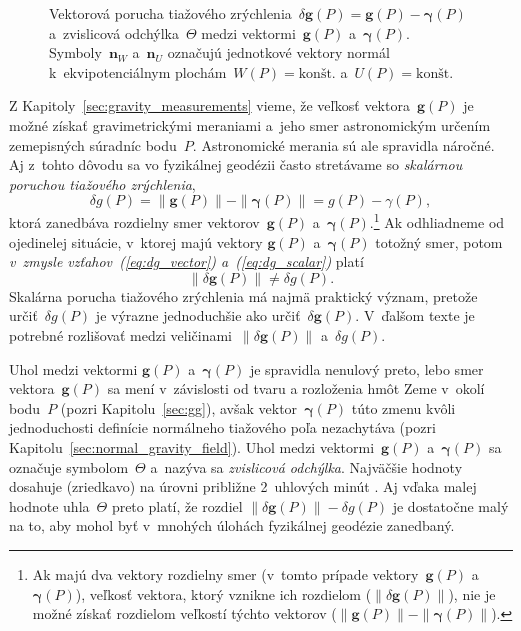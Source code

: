 \documentclass[a4paper, 12pt]{book}
\let\vec\mathbf
\begin{document}
\begin{figure}[bt]
\centering

\caption{Vektorová porucha tiažového zrýchlenia~$\delta \vec g(P) = \vec g(P) 
- \boldsymbol\gamma(P)$ a~zvislicová odchýlka~$\Theta$ medzi vektormi~$\vec 
g(P)$ a~$\boldsymbol\gamma(P)$.  Symboly~$\vec n_W$ a~$\vec n_U$ označujú 
jednotkové vektory normál k~ekvipotenciálnym plochám~$W(P) 
= \textrm{kon\v{s}t.}$ a~$U(P) = \textrm{kon\v{s}t.}$}
\label{fig:gravity_disturbance}
\end{figure}

Z Kapitoly~\ref{sec:gravity_measurements} vieme, že veľkosť vektora~$\vec g(P)$ 
je možné získať gravimetrickými meraniami a~jeho smer astronomickým určením 
zemepisných súradníc bodu~$P$.  Astronomické merania sú ale spravidla náročné.  
Aj z~tohto dôvodu sa vo fyzikálnej geodézii často stretávame so \emph{skalárnou 
poruchou tiažového zrýchlenia},
%
\begin{equation}
\label{eq:dg_scalar}
\delta g(P) = \| \vec g(P) \| - \| \boldsymbol \gamma(P) \| = g(P) 
- \gamma(P){,}
\end{equation}
%
ktorá zanedbáva rozdielny smer vektorov~$\vec g(P)$ a~$\boldsymbol 
\gamma(P)$.\footnote{Ak majú dva vektory rozdielny smer (v~tomto prípade 
vektory~$\vec g(P)$ a~$\boldsymbol \gamma(P)$), veľkosť vektora, ktorý vznikne 
ich rozdielom ($\| \delta \vec g(P) \|$), nie je možné získať rozdielom 
veľkostí týchto vektorov ($\| \vec g(P) \| - \| \boldsymbol \gamma(P) \|$).}  
Ak odhliadneme od ojedinelej situácie, v~ktorej majú vektory $\vec g(P)$ 
a~$\boldsymbol{\gamma}(P)$ totožný smer, potom \emph{v~zmysle 
vzťahov~(\ref{eq:dg_vector}) a~(\ref{eq:dg_scalar})} platí
%
\begin{equation}
\| \delta \vec g(P) \| \neq \delta g(P){.}
\end{equation}
%
Skalárna porucha tiažového zrýchlenia má najmä praktický význam, pretože 
určiť~$\delta g(P)$ je výrazne jednoduchšie ako určiť~$\delta \vec g(P)$.  
V~ďalšom texte je potrebné rozlišovať medzi veličinami~$\| \delta \vec g(P) \|$ 
a~$\delta g(P)$.

Uhol medzi vektormi $\vec g(P)$ a~$\boldsymbol{\gamma}(P)$ je spravidla 
nenulový preto, lebo smer vektora~$\vec g(P)$ sa mení v~závislosti od tvaru 
a rozloženia hmôt Zeme v~okolí bodu~$P$ (pozri Kapitolu~\ref{sec:gg}), avšak 
vektor~$\boldsymbol \gamma(P)$ túto zmenu kvôli jednoduchosti definície 
normálneho tiažového poľa nezachytáva (pozri 
Kapitolu~\ref{sec:normal_gravity_field}).  Uhol medzi vektormi~$\vec g(P)$ 
a~$\boldsymbol \gamma(P)$ sa označuje symbolom~$\Theta$ a~nazýva sa 
\emph{zvislicová odchýlka}.  Najväčšie hodnoty dosahuje (zriedkavo) na úrovni 
približne 2~uhlových minút \parencite{GGMplus}.  Aj vďaka malej hodnote 
uhla~$\Theta$ preto platí, že rozdiel $\| \delta \vec g(P) \| - \delta g(P)$ je 
dostatočne malý na to, aby mohol byť v~mnohých úlohách fyzikálnej geodézie 
zanedbaný.
\end{document}
